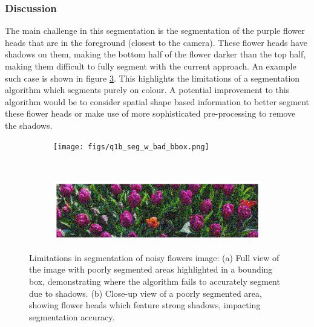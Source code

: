 \documentclass[11pt]{article}
\begin{document}
\subsubsection{Discussion}
The main challenge in this segmentation is the segmentation of the purple flower heads that are in the foreground (closest to the camera). These flower heads have shadows on them, making the bottom half of the flower darker than the top half, making them difficult to fully segment with the current approach. An example such case is shown in figure \ref{fig:q1b_seg_lim}. This highlights the limitations of a segmentation algorithm which segments purely on colour. A potential improvement to this algorithm would be to consider spatial shape based information to better segment these flower heads or make use of more sophisticated pre-processing to remove the shadows.
\begin{figure}[H]
    \centering
    \begin{subfigure}{.8\textwidth}
        \centering
        \texttt{[image: figs/q1b\_seg\_w\_bad\_bbox.png]}
        \caption{}  %
        \label{fig:q1b_bad_seg_w_bbox}
    \end{subfigure}\\ %
    \begin{subfigure}{.8\textwidth}
        \centering
        \includegraphics[width=\linewidth]{figs/q1b_bad_zoomed_region.png}
        \caption{}  %
        \label{fig:q1b_bad_zoom}
    \end{subfigure}
    \caption{Limitations in segmentation of noisy flowers image: (a) Full view of the image with poorly segmented areas highlighted in a bounding box, demonstrating where the algorithm fails to accurately segment due to shadows. (b) Close-up view of a poorly segmented area, showing flower heads which feature strong shadows, impacting segmentation accuracy.}
    \label{fig:q1b_seg_lim}
\end{figure}

\end{document}
